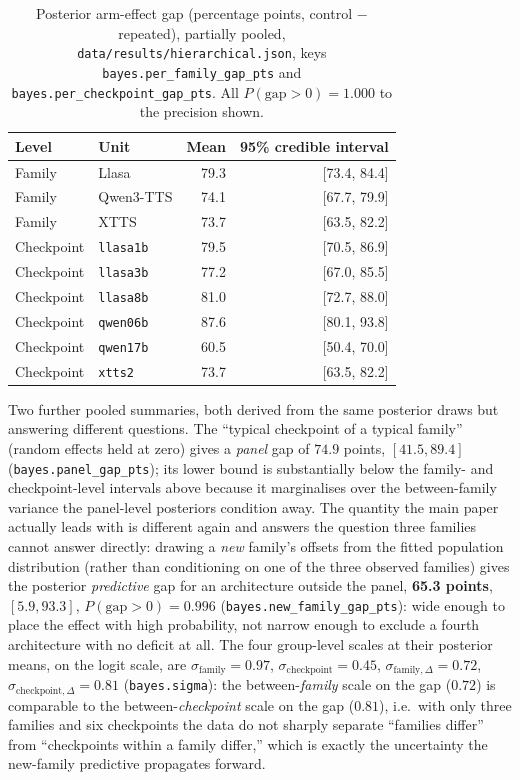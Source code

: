 \documentclass[11pt]{article}
\begin{document}
\begin{table}[h]
\centering
\caption{Posterior arm-effect gap (percentage points, control $-$ repeated),
partially pooled, \texttt{data/results/hierarchical.json}, keys
\texttt{bayes.per\_family\_gap\_pts} and \texttt{bayes.per\_checkpoint\_gap\_pts}.
All $P(\mathrm{gap}>0)=1.000$ to the precision shown.}
\label{tab:hier-bayes}
\small
\begin{tabular}{@{}llrr@{}}
\toprule
Level & Unit & Mean & 95\% credible interval \\
\midrule
Family & Llasa      & 79.3 & [73.4, 84.4] \\
Family & Qwen3-TTS  & 74.1 & [67.7, 79.9] \\
Family & XTTS       & 73.7 & [63.5, 82.2] \\
\addlinespace
Checkpoint & \texttt{llasa1b} & 79.5 & [70.5, 86.9] \\
Checkpoint & \texttt{llasa3b} & 77.2 & [67.0, 85.5] \\
Checkpoint & \texttt{llasa8b} & 81.0 & [72.7, 88.0] \\
Checkpoint & \texttt{qwen06b} & 87.6 & [80.1, 93.8] \\
Checkpoint & \texttt{qwen17b} & 60.5 & [50.4, 70.0] \\
Checkpoint & \texttt{xtts2}   & 73.7 & [63.5, 82.2] \\
\bottomrule
\end{tabular}
\end{table}

Two further pooled summaries, both derived from the same posterior draws but
answering different questions. The ``typical checkpoint of a typical family''
(random effects held at zero) gives a \emph{panel} gap of $74.9$ points,
$[41.5, 89.4]$ (\texttt{bayes.panel\_gap\_pts}); its lower bound is
substantially below the family- and checkpoint-level intervals above because
it marginalises over the between-family variance the panel-level posteriors
condition away. The quantity the main paper actually leads with is different
again and answers the question three families cannot answer directly: drawing
a \emph{new} family's offsets from the fitted population distribution (rather
than conditioning on one of the three observed families) gives the posterior
\emph{predictive} gap for an architecture outside the panel, \textbf{65.3
points}, $[5.9, 93.3]$, $P(\mathrm{gap}>0)=0.996$
(\texttt{bayes.new\_family\_gap\_pts}): wide enough to place the effect with
high probability, not narrow enough to exclude a fourth architecture with no
deficit at all. The four group-level scales at their posterior means, on the
logit scale, are $\sigma_{\mathrm{family}}=0.97$,
$\sigma_{\mathrm{checkpoint}}=0.45$, $\sigma_{\mathrm{family},\Delta}=0.72$,
$\sigma_{\mathrm{checkpoint},\Delta}=0.81$ (\texttt{bayes.sigma}): the
between-\emph{family} scale on the gap ($0.72$) is comparable to the
between-\emph{checkpoint} scale on the gap ($0.81$), i.e.\ with only three
families and six checkpoints the data do not sharply separate ``families
differ'' from ``checkpoints within a family differ,'' which is exactly the
uncertainty the new-family predictive propagates forward.
\end{document}
